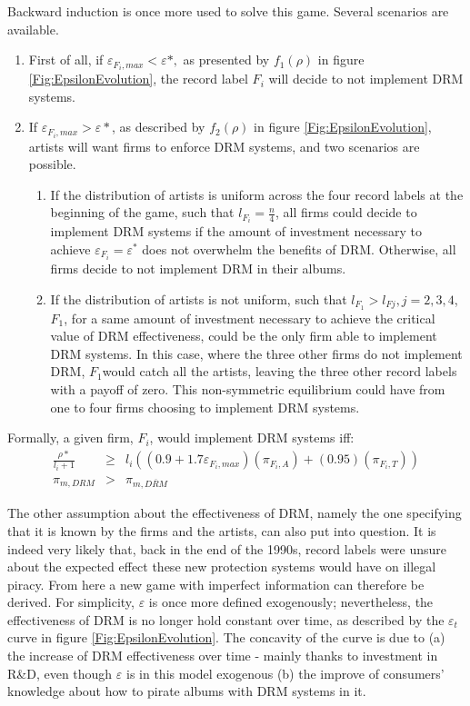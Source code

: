 \documentclass[letter,12pt]{article}
\numberwithin{equation}{section}
\begin{document}
Backward induction is once more used to solve this game. Several scenarios
are available. 
\begin{enumerate}
\item First of all, if $\varepsilon_{F_{i},max}<\varepsilon*,$ as presented
by $f_{1}(\rho)$ in figure \ref{Fig:EpsilonEvolution}, the record label $F_{i}$ will decide to not implement DRM systems.
\item If $\varepsilon_{F_{i},max}>\varepsilon*$, as described by $f_{2}(\rho)$
in figure \ref{Fig:EpsilonEvolution}, artists will want firms to enforce DRM systems, and two scenarios are possible.

\begin{enumerate}
\item If the distribution of artists is uniform across the four record labels
at the beginning of the game, such that $l_{F_{i}}=\frac{n}{4}$,
all firms could decide to implement DRM systems if the amount of investment
necessary to achieve $\varepsilon_{F_{i}}=\varepsilon^*$ does not overwhelm
the benefits of DRM. Otherwise, all firms decide to not implement
DRM in their albums. 
\item If the distribution of artists is not uniform, such that $l_{F_{1}}>l_{Fj},$$j=2,3,4$,$F_{1}$, for a same amount of investment necessary to achieve the critical
value of DRM effectiveness, could be the only firm able to implement
DRM systems. In this case, where the three other firms do not implement
DRM, $F_{1}$would catch all the artists, leaving the three other
record labels with a payoff of zero. This non-symmetric equilibrium
could have from one to four firms choosing to implement DRM systems. 
\end{enumerate}
\end{enumerate}

Formally, a given firm, $F_{i}$, would implement DRM systems iff:
\begin{eqnarray*}
\frac{\rho*}{l_{i}+1} & \geq & l_{i}((0.9+1.7\varepsilon_{F_{i},max})(\pi_{F_{i},A})+(0.95)(\pi_{F_{i},T}))\\
\pi_{m,DRM} & > & \pi_{m,\overline{DRM}}
\end{eqnarray*}

The other assumption about the effectiveness of DRM, namely the one
specifying that it is known by the firms and the artists, can also
put into question. It is indeed very likely that, back in the end
of the 1990s, record labels were unsure about the expected effect
these new protection systems would have on illegal piracy. From here
a new game with imperfect information can therefore be derived. For
simplicity, $\varepsilon$ is once more defined exogenously; nevertheless,
the effectiveness of DRM is no longer hold constant over time, as
described by the $\varepsilon_{t}$ curve in figure \ref{Fig:EpsilonEvolution}. The concavity
of the curve is due to (a) the increase of DRM effectiveness over
time - mainly thanks to investment in R\&D, even though $\varepsilon$
is in this model exogenous (b) the improve of consumers' knowledge
about how to pirate albums with DRM systems in it.\\
\end{document}
